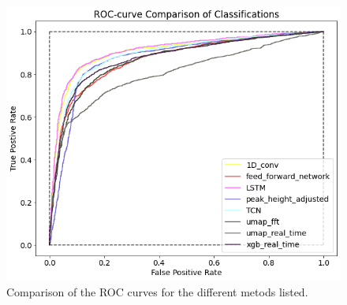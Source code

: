 \begin{figure}[h]
    \centering
    \includegraphics[width = 0.75 \textwidth]{Figures/johann_first/AUC_comparison.png}
    \caption{Comparison of the ROC curves for the different metods listed.}
    \label{fig:AUC_comparison}
\end{figure}

